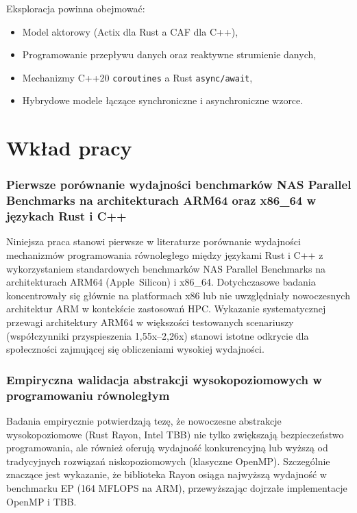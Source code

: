 Eksploracja powinna obejmować:
\begin{itemize}
    \item Model aktorowy (Actix dla Rust a CAF dla C++),
    \item Programowanie przepływu danych oraz reaktywne strumienie danych,
    \item Mechanizmy C++20 \texttt{coroutines} a Rust \texttt{async/await},
    \item Hybrydowe modele łączące synchroniczne i asynchroniczne wzorce.
\end{itemize}


\section{Wkład pracy}

\subsubsection{Pierwsze porównanie wydajności benchmarków NAS Parallel Benchmarks na architekturach ARM64 oraz x86\_64 w językach Rust i C++}

Niniejsza praca stanowi pierwsze w literaturze porównanie wydajności mechanizmów programowania równoległego między językami Rust i C++ z wykorzystaniem standardowych benchmarków NAS Parallel Benchmarks na architekturach ARM64 \mbox{(Apple Silicon)} i x86\_64. Dotychczasowe badania koncentrowały się głównie na platformach x86 lub nie uwzględniały nowoczesnych architektur ARM w kontekście zastosowań HPC. Wykazanie systematycznej przewagi architektury ARM64 w większości testowanych scenariuszy (współczynniki przyspieszenia 1,55x--2,26x) stanowi istotne odkrycie dla społeczności zajmującej się obliczeniami wysokiej wydajności.

\subsubsection{Empiryczna walidacja abstrakcji wysokopoziomowych w programowaniu równoległym}

Badania empirycznie potwierdzają tezę, że nowoczesne abstrakcje wysokopoziomowe (Rust Rayon, Intel TBB) nie tylko zwiększają bezpieczeństwo programowania, ale również oferują wydajność konkurencyjną lub wyższą od tradycyjnych rozwiązań niskopoziomowych (klasyczne OpenMP). Szczególnie znaczące jest wykazanie, że biblioteka Rayon osiąga najwyższą wydajność w benchmarku EP (164 MFLOPS na ARM), przewyższając dojrzałe implementacje OpenMP i TBB.

